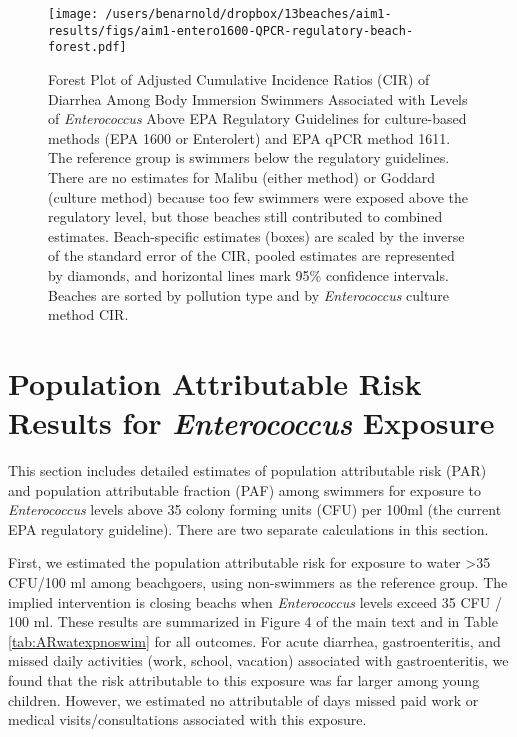 \documentclass[12pt]{article}\usepackage[]{graphicx}\usepackage[]{color}
\begin{document}
\begin{landscape}
\begin{figure}[h!tb]
\begin{center}
\texttt{[image: /users/benarnold/dropbox/13beaches/aim1-results/figs/aim1-entero1600-QPCR-regulatory-beach-forest.pdf]}
\caption{Forest Plot of Adjusted Cumulative Incidence Ratios (CIR) of Diarrhea Among Body Immersion Swimmers Associated with  Levels of \emph{Enterococcus} Above EPA Regulatory Guidelines for culture-based methods (EPA 1600 or Enterolert) and EPA qPCR method 1611. The reference group is swimmers below the regulatory guidelines. There are no estimates for Malibu (either method) or Goddard (culture method) because too few swimmers were exposed above the regulatory level, but those beaches still contributed to combined estimates. Beach-specific estimates (boxes) are scaled by the inverse of the standard error of the CIR, pooled estimates are represented by diamonds, and horizontal lines mark 95\% confidence intervals. Beaches are sorted by pollution type and by \textit{Enterococcus} culture method CIR.\label{fig:enteroregforest}}
\end{center}
\end{figure}
\end{landscape}



\clearpage
\section{Population Attributable Risk Results for \textit{Enterococcus} Exposure}

This section includes detailed estimates of population attributable risk (PAR) and population attributable fraction (PAF) among swimmers for exposure to \textit{Enterococcus} levels above 35 colony forming units (CFU) per 100ml (the current EPA regulatory guideline). There are two separate calculations in this section. 

First, we estimated the population attributable risk for exposure to water >35 CFU/100 ml among beachgoers, using non-swimmers as the reference group. The implied intervention is closing beachs when \textit{Enterococcus} levels exceed 35 CFU / 100 ml.  These results are summarized in Figure 4 of the main text and in Table \ref{tab:ARwatexpnoswim} for all outcomes. For acute diarrhea, gastroenteritis, and missed daily activities (work, school, vacation) associated with gastroenteritis, we found that the risk attributable to this exposure was far larger among young children. However, we estimated no attributable of days missed paid work or medical visits/consultations associated with this exposure.
\end{document}
